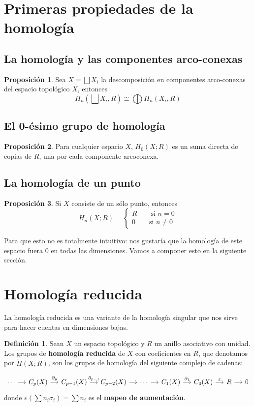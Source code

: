 \documentclass[spanish]{book}
\theoremstyle{definition}
\newtheorem*{defn}{Definición}
\newtheorem*{prop}{Proposición}
\begin{document}
\section{Primeras propiedades de la homología}
\subsection{La homología y las componentes arco-conexas}
\begin{prop}
	Sea $X=\bigsqcup X_i$ la descomposición en componentes arco-conexas del espacio topológico $X$, entonces
	\[H_n\left(\bigsqcup X_i,R\right)\cong \bigoplus H_n(X_i,R)\]
\end{prop}
\subsection{El 0-ésimo grupo de homología}
\begin{prop}
	Para cualquier espacio $X$, $H_0(X;R)$ es un suma directa de copias de $R$, una por cada componente arcoconexa.
\end{prop}
\subsection{La homología de un punto}
	 \begin{prop}
	 	Si $X$ consiste de un sólo punto, entonces
	 	\[H_n(X;R)=\begin{cases}R\qquad\text{si   } n=0\\
	 	0\qquad\text{si   } n\neq0
		 \end{cases}\]
	\end{prop}
	Para que esto no es totalmente intuitivo: nos gustaría que la homología de este espacio fuera 0 en todas las dimensiones. Vamos a componer esto en la siguiente sección.
\section{Homología reducida}\label{sec:6.4}
	La homología reducida es una variante de la homología singular que nos sirve para hacer cuentas en dimensiones bajas.
	
	\begin{defn}
		Sean $X$ un espacio topológico y $R$ un anillo asociativo con unidad. Los grupos de \textbf{homología reducida} de $X$ con coeficientes en $R$, que denotamos por $\tilde{H}(X;R)$, son los grupos de homología del siguiente complejo de cadenas:
	
		\[\begin{tikzcd}[column sep=small]
			\cdots \arrow[r] & C_p(X) \arrow[r, "\partial_p"] & C_{p-1}(X) \arrow[r, "\partial_{p-1}"] & C_{p-2}(X) \arrow[r] & \cdots \arrow[r] & C_1(X) \arrow[r, "\partial_1"] & C_0(X) \arrow[r, "\varepsilon"] & R \arrow[r] & 0
		\end{tikzcd}\]
		donde $\varepsilon(\sum n_i\sigma_i)=\sum n_i$ es el \textbf{mapeo de aumentación}.
	\end{defn}
	
\end{document}
